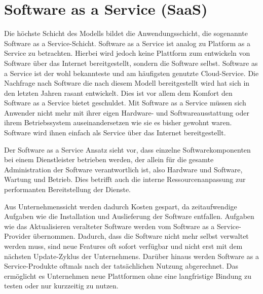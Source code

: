 \section{Software as a Service (SaaS)}
\label{sec:saas}
Die höchste Schicht des Modells bildet die Anwendungsschicht, die sogenannte Software as a Service-Schicht.
Software as a Service ist analog zu Platform as a Service zu betrachten. Hierbei wird jedoch keine Plattform zum entwickeln von Software über das Internet bereitgestellt, sondern die Software selbst. \cite{kepes_understanding_????}
Software as a Service ist der wohl bekannteste und am häufigsten genutzte Cloud-Service. Die Nachfrage nach Software die nach diesem Modell bereitgestellt wird hat sich in den letzten Jahren rasant entwickelt. Dies ist vor allem dem Komfort den Software as a Service bietet geschuldet.
Mit Software as a Service müssen sich Anwender nicht mehr mit ihrer eigen Hardware- und Softwareausstattung oder ihrem Betriebssystem auseinandersetzen wie sie es bisher gewohnt waren. Software wird ihnen einfach als Service über das Internet bereitgestellt.

Der Software as a Service \glqq Ansatz sieht vor, dass einzelne Softwarekomponenten bei einem Dienstleister betrieben werden, der allein für die gesamte Administration der Software verantwortlich ist, also Hardware und Software, Wartung und Betrieb. Dies betrifft auch die interne Ressourcenanpassung zur performanten Bereitstellung der Dienste.\grqq \cite[S. 34]{meinel_virtualisierung_2011}

Aus Unternehmenssicht werden dadurch Kosten gespart, da zeitaufwendige Aufgaben wie die Installation und Auslieferung der Software entfallen. Aufgaben wie das Aktualisieren veralteter Software werden vom Software as a Service-Provider übernommen. Dadurch, dass die Software nicht mehr selbst verwaltet werden muss, sind neue Features oft sofort verfügbar und nicht erst mit dem nächsten Update-Zyklus der Unternehmens.
Darüber hinaus werden Software as a Service-Produkte oftmals nach der tatsächlichen Nutzung abgerechnet. Das ermöglicht es Unternehmen neue Plattformen ohne eine langfristige Bindung zu testen oder nur kurzzeitig zu nutzen.